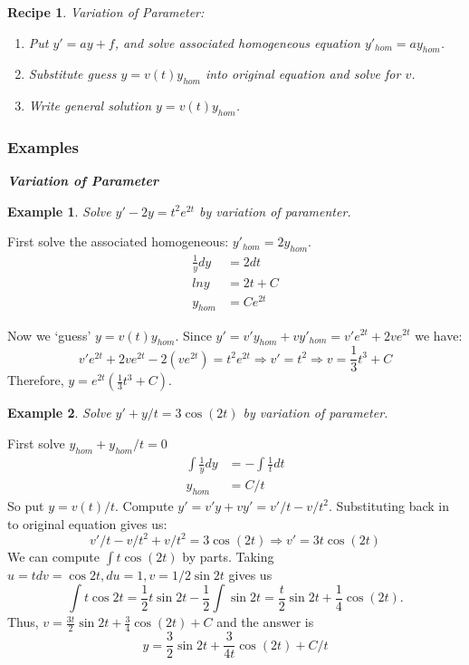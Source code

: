 \documentclass[14pt]{article}
\newtheorem{re}{Recipe}
\newtheorem{ex}{Example}
\newcommand{\type}[1]{\begin{center} \emph{\textbf{#1}} \end{center}}
\newcommand{\exs}{\subsubsection*{Examples}}
\begin{document}
\begin{re} Variation of Parameter:
\begin{enumerate}
\item Put $y' = a y + f $, and solve  associated homogeneous equation $ y'_{hom} = a y_{hom}$.
\item Substitute guess $y = v(t) y_{hom}$ into original equation and solve for $v$. 
\item Write general solution $y = v(t) y_{hom}$.
\end{enumerate}
\end{re}

\exs

\type{Variation of Parameter}

\begin{ex} Solve $y' -2 y = t^2 e^{2 t  }$ by variation of paramenter.\end{ex}

First solve the associated homogeneous: $y'_{hom} = 2 y_{hom}$.
\begin{align*} \frac{1}{y} dy &= 2 dt \\
ln y &= 2 t + C \\
y_{hom} &= C e^{2t}
\end{align*}

Now we `guess' $ y = v(t) y_{hom}$. Since $y' = v' y_{hom} + v y'_{hom} = v' e^{2t} + 2  v e^{2t}$ we have:
\[v' e^{2t} + 2  v e^{2t} - 2(v e^{2t}) = t^2 e^{2t} \Rightarrow v' = t^2 \Rightarrow v = \frac{1}{3} t^3 + C\]
Therefore, $y = e^{2t} \left( \frac{1}{3} t^3 + C \right)$.

\begin{ex}\label{vopint} Solve  $y' + y / t = 3 \cos{(2t)}$ by variation of parameter.\end{ex}

First solve $y_{hom}  + y_{hom} / t = 0$
\begin{align*} \int \frac{1}{y} dy &= - \int \frac{1}{t} dt \\ y_{hom} &= C / t\end{align*}
So put $y = v(t) / t$. Compute $y ' = v' y + v y' = v' / t - v / t^2$. Substituting back in to original equation gives us:
\[v' / t - v / t^2 + v / t^2 = 3 \cos{(2t)} \Rightarrow v' = 3t \cos{(2t)}\]
We can compute $\int t \cos{(2t)}$ by parts. Taking $u = t dv = \cos 2t, du = 1, v = 1/2 \sin 2t$ gives us
\[\int t \cos 2 t = \frac{1}{2} t \sin 2t  - \frac{1}{2} \int \sin 2t= \frac{t}{2}  \sin 2t  + \frac{1}{4}\cos{(2t)}.\]
Thus, $v =  \frac{3 t}{2}  \sin 2t  + \frac{3}{4}\cos{(2t)}+ C $ and the answer is
\[y = \frac{3 }{2}  \sin 2t  + \frac{3}{4t }\cos{(2t)}+ C /t  \]
\end{document}
